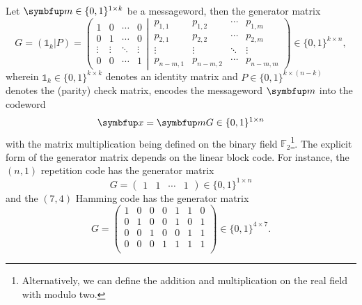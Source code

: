 Let $\vb{m}\in\{0,1\}^{1\times k}$ be a messageword, then the generator matrix
\begin{equation}
	G
	=
	\left(
		\mathbb{1}_k
		\vert
		P
	\right)
	=
	\left(
		\begin{matrix}
			1 & 0 & \cdots & 0 \\
			0 & 1 & \cdots & 0 \\
			\vdots & \vdots  & \ddots & \vdots \\
			0 & 0 & \cdots & 1
		\end{matrix}
		\left|
		\,
		\begin{matrix}
			p_{1,1} & p_{1,2} & \cdots & p_{1,m} \\
			p_{2,1} & p_{2,2} & \cdots & p_{2,m} \\
			\vdots & \vdots & \ddots & \vdots \\
			p_{n-m,1} & p_{n-m,2} & \cdots & p_{n-m,m}
		\end{matrix}
		\right.
	\right)
	\in\{0,1\}^{k\times n}
	,
\end{equation}
wherein $\mathbb{1}_k\in\{0,1\}^{k\times k}$ denotes an identity matrix and $P\in\{0,1\}^{k\times(n-k)}$ denotes the (parity) check matrix,
encodes the messageword $\vb{m}$ into the codeword
\begin{equation}
	\vb{x}
	=
	\vb{m}G
	\in\{0,1\}^{1\times n}
\end{equation}
with the matrix multiplication being defined on the binary field $\mathbb{F}_2$\footnote{Alternatively, we can define the addition and multiplication on the real field with modulo two.}.
The explicit form of the generator matrix depends on the linear block code.
For instance, the $(n,1)$ repetition code has the generator matrix
\begin{equation}
	G
	=
	\begin{pmatrix}
		1 & 1 & \cdots & 1
	\end{pmatrix}
	\in\{0,1\}^{1\times n}
\end{equation}
and the $(7,4)$ Hamming code has the generator matrix
\begin{equation}
	G
	=
	\begin{pmatrix}
		1 & 0 & 0 & 0 & 1 & 1 & 0 \\
		0 & 1 & 0 & 0 & 1 & 0 & 1 \\
		0 & 0 & 1 & 0 & 0 & 1 & 1 \\
		0 & 0 & 0 & 1 & 1 & 1 & 1 \\
	\end{pmatrix}
	\in\{0,1\}^{4\times 7}
	.
\end{equation}
